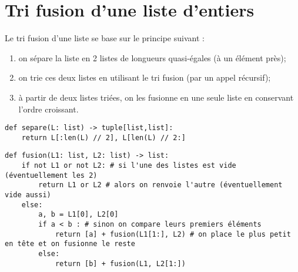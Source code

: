 \section*{Tri fusion d'une liste d'entiers}

Le tri fusion d'une liste se base sur le principe suivant : 
\begin{enumerate}
\item on sépare la liste en 2 listes de longueurs quasi-égales (à un élément près);
\item on trie ces deux listes en utilisant le tri fusion (par un appel récursif);
\item à partir de deux listes triées, on les fusionne en une seule liste en conservant l'ordre croissant.
\end{enumerate}

\ifprof
\begin{corrige}
\begin{lstlisting}
def separe(L: list) -> tuple[list,list]:
    return L[:len(L) // 2], L[len(L) // 2:]
\end{lstlisting}
\end{corrige}
\else
\fi

\ifprof
\begin{corrige}
\end{corrige}
\else
\fi


\ifprof
\begin{corrige}
\begin{lstlisting}
def fusion(L1: list, L2: list) -> list:
    if not L1 or not L2: # si l'une des listes est vide (éventuellement les 2)
        return L1 or L2 # alors on renvoie l'autre (éventuellement vide aussi)
    else:
        a, b = L1[0], L2[0] 
        if a < b : # sinon on compare leurs premiers éléments
            return [a] + fusion(L1[1:], L2) # on place le plus petit en tête et on fusionne le reste
        else:
            return [b] + fusion(L1, L2[1:])
\end{lstlisting}
\end{corrige}
\else
\fi

